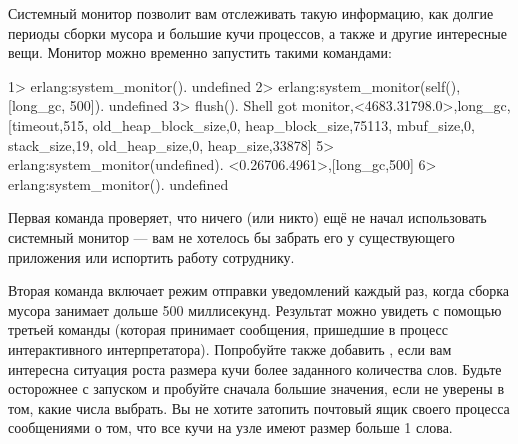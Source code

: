 Системный монитор позволит вам отслеживать такую информацию, как долгие периоды сборки мусора и большие кучи процессов, а также и другие интересные вещи. Монитор можно временно запустить такими командами:

\begin{VerbatimEshell}
1> erlang:system_monitor().
undefined
2> erlang:system_monitor(self(), [{long_gc, 500}]).
undefined
3> flush().
Shell got {monitor,<4683.31798.0>,long_gc,
                   [{timeout,515},
                    {old_heap_block_size,0},
                    {heap_block_size,75113},
                    {mbuf_size,0},
                    {stack_size,19},
                    {old_heap_size,0},
                    {heap_size,33878}]}
5> erlang:system_monitor(undefined).
{<0.26706.4961>,[{long_gc,500}]}
6> erlang:system_monitor().
undefined
\end{VerbatimEshell}

Первая команда проверяет, что ничего (или никто) ещё не начал использовать системный монитор --- вам не хотелось бы забрать его у существующего приложения или испортить работу сотруднику.

Вторая команда включает режим отправки уведомлений каждый раз, когда сборка мусора занимает дольше 500 миллисекунд. Результат можно увидеть с помощью третьей команды (которая принимает сообщения, пришедшие в процесс интерактивного интерпретатора). Попробуйте также добавить , если вам интересна ситуация роста размера кучи более заданного количества слов.
Будьте осторожнее с запуском и пробуйте сначала большие значения, если не уверены в том, какие числа выбрать. Вы не хотите затопить почтовый ящик своего процесса сообщениями о том, что все кучи на узле имеют размер больше 1 слова.

